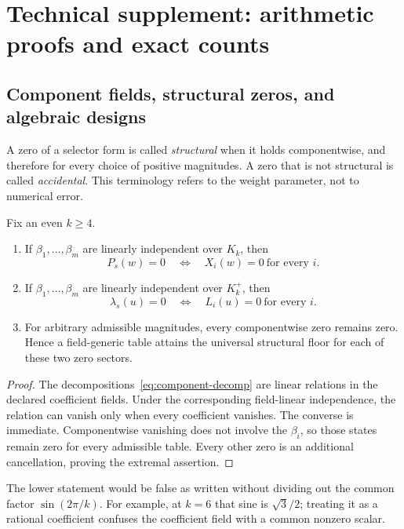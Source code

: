 \section{Technical supplement: arithmetic proofs and exact counts}

\subsection{Component fields, structural zeros, and algebraic designs}
\label{sec:components}

A zero of a selector form is called \emph{structural} when it holds
componentwise, and therefore for every choice of positive magnitudes.  A zero
that is not structural is called \emph{accidental}.  This terminology refers
to the weight parameter, not to numerical error.

\begin{theorem}
\label{thm:component-field}
Fix an even $k\ge4$.
\begin{enumerate}
  \item If $\beta_1,\ldots,\beta_m$ are linearly independent over $K_k$, then
  \[
    P_s(w)=0 \quad\Longleftrightarrow\quad X_i(w)=0\ \text{for every }i.
  \]
  \item If $\beta_1,\ldots,\beta_m$ are linearly independent over $K_k^+$,
  then
  \[
    \lambda_s(u)=0 \quad\Longleftrightarrow\quad L_i(u)=0\ \text{for every }i.
  \]
  \item For arbitrary admissible magnitudes, every componentwise zero remains
  zero.  Hence a field-generic table attains the universal structural floor
  for each of these two zero sectors.
\end{enumerate}
\end{theorem}

\begin{proof}
The decompositions~\eqref{eq:component-decomp} are linear relations in the
declared coefficient fields.  Under the corresponding field-linear
independence, the relation can vanish only when every coefficient vanishes.
The converse is immediate.  Componentwise vanishing does not involve the
$\beta_i$, so those states remain zero for every admissible table.  Every
other zero is an additional cancellation, proving the extremal assertion.
\end{proof}

The lower statement would be false as written without dividing out the
common factor $\sin(2\pi/k)$.  For example, at $k=6$ that sine is
$\sqrt3/2$; treating it as a rational coefficient confuses the coefficient
field with a common nonzero scalar.

